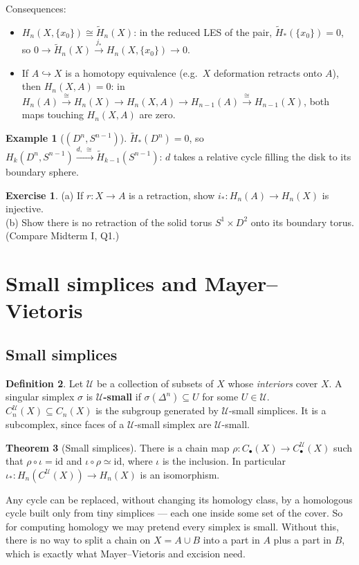 \documentclass[11pt]{article}
\newcommand{\Hred}{\tilde H}
\theoremstyle{definition}
\newtheorem{thm}{Theorem}[section]
\newtheorem{defn}[thm]{Definition}
\newtheorem{ex}[thm]{Example}
\newtheorem{exercise}{Exercise}[section]
\begin{document}
Consequences:
\begin{itemize}
\item $H_n(X,\{x_0\})\cong\Hred_n(X)$: in the reduced LES of the pair, $\Hred_*(\{x_0\})=0$, so $0\to\Hred_n(X)\xrightarrow{j_*}H_n(X,\{x_0\})\to0$.
\item If $A\hookrightarrow X$ is a homotopy equivalence (e.g.\ $X$ deformation retracts onto $A$), then $H_n(X,A)=0$: in $H_n(A)\xrightarrow{\cong}H_n(X)\to H_n(X,A)\to H_{n-1}(A)\xrightarrow{\cong}H_{n-1}(X)$, both maps touching $H_n(X,A)$ are zero.
\end{itemize}

\begin{ex}[$(D^n,S^{n-1})$]
$\Hred_*(D^n)=0$, so $H_k(D^n,S^{n-1})\xrightarrow{d,\ \cong}\Hred_{k-1}(S^{n-1})$: $d$ takes a relative cycle filling the disk to its boundary sphere.
\end{ex}

\begin{exercise}\label{exr:retract}
(a) If $r:X\to A$ is a retraction, show $i_*:H_n(A)\to H_n(X)$ is injective.\\
(b) Show there is no retraction of the solid torus $S^1\times D^2$ onto its boundary torus. (Compare Midterm I, Q1.)
\end{exercise}

\section{Small simplices and Mayer--Vietoris}

\subsection{Small simplices}
\begin{defn}
Let $\mathcal U$ be a collection of subsets of $X$ whose \emph{interiors} cover $X$. A singular simplex $\sigma$ is \textbf{$\mathcal U$-small} if $\sigma(\Delta^n)\subseteq U$ for some $U\in\mathcal U$. $C_n^{\mathcal U}(X)\subseteq C_n(X)$ is the subgroup generated by $\mathcal U$-small simplices. It is a subcomplex, since faces of a $\mathcal U$-small simplex are $\mathcal U$-small.
\end{defn}
\begin{thm}[Small simplices]
There is a chain map $\rho:C_\bullet(X)\to C_\bullet^{\mathcal U}(X)$ such that $\rho\circ\iota=\mathrm{id}$ and $\iota\circ\rho\simeq\mathrm{id}$, where $\iota$ is the inclusion. In particular $\iota_*:H_n(C^{\mathcal U}(X))\to H_n(X)$ is an isomorphism.
\end{thm}
\begin{intuition}
Any cycle can be replaced, without changing its homology class, by a homologous cycle built only from tiny simplices --- each one inside some set of the cover. So for computing homology we may pretend every simplex is small. Without this, there is no way to split a chain on $X=A\cup B$ into a part in $A$ plus a part in $B$, which is exactly what Mayer--Vietoris and excision need.
\end{intuition}
\end{document}
